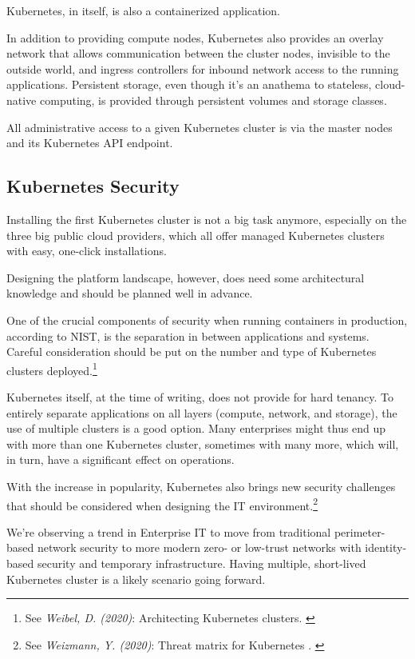 Kubernetes, in itself, is also a containerized application.

In addition to providing compute nodes, Kubernetes also provides an overlay network that allows communication between the cluster nodes, invisible to the outside world, and ingress controllers for inbound network access to the running applications. Persistent storage, even though it's an anathema to stateless, cloud-native computing, is provided through persistent volumes and storage classes.

All administrative access to a given Kubernetes cluster is via the master nodes and its Kubernetes API endpoint.

\subsection{Kubernetes Security}

Installing the first Kubernetes cluster is not a big task anymore, especially on the three big public cloud providers, which all offer managed Kubernetes clusters with easy, one-click installations.

Designing the platform landscape, however, does need some architectural knowledge and should be planned well in advance.

One of the crucial components of security when running containers in production, according to NIST, is the separation in between applications and systems. Careful consideration should be put on the number and type of Kubernetes clusters deployed.\footnote{See \textit{Weibel, D. (2020)}: Architecting Kubernetes clusters. \cite{howMany}}

Kubernetes itself, at the time of writing, does not provide for hard tenancy. To entirely separate applications on all layers (compute, network, and storage), the use of multiple clusters is a good option. Many enterprises might thus end up with more than one Kubernetes cluster, sometimes with many more, which will, in turn, have a significant effect on operations.

With the increase in popularity, Kubernetes also brings new security challenges that should be considered when designing the IT environment.\footnote{See \textit{Weizmann, Y. (2020)}: Threat matrix for Kubernetes . \cite{threatMatrix}}

We're observing a trend in Enterprise IT to move from traditional perimeter-based network security to more modern zero- or low-trust networks with identity-based security and temporary infrastructure. Having multiple, short-lived Kubernetes cluster is a likely scenario going forward.

